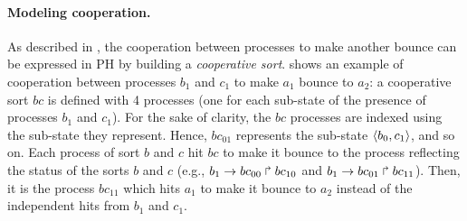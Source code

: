 \begin{comment}
This PH example actually models a BRN where the component $a$ has three qualitative
levels and components $b$ and $c$ are boolean.
In this BRN, $b$ and $c$ activate $a$, while $a$ inhibits $b$.
The inhibition of $b$ by $a$ is only effective when $a$ is at level $2$;
in the other cases, $b$ cannot evolve in any direction.
The activation of $a$ by $b$ ($c$) is encoded by the actions making the level of $a$ increase (resp.
decrease) when $b$ ($c$) is present (resp. absent).
It is worth noticing that the activation of $a$ by $b$ ($c$) is independent from $c$ ($b$).
This may express a lack of knowledge on the cooperation between these two regulators:
we thus model an over-approximation of the possible actions.
\end{example*}
\end{comment}

\paragraph{Modeling cooperation.}
As described in \cite{PMR10-TCSB}, the cooperation between processes to make another bounce can be
expressed in PH by building a \emph{cooperative sort}.
 shows an example of cooperation between processes $b_1$ and $c_1$ to
make $a_1$ bounce to $a_2$:
a cooperative sort $bc$ is defined with 4 processes (one for each sub-state of the presence of
processes $b_1$ and $c_1$).
For the sake of clarity, the $bc$ processes are indexed using the sub-state they represent.
Hence, $bc_{01}$ represents the sub-state $\mbox{$\langle b_0,c_1 \rangle$}$, and so on.
Each process of sort $b$ and $c$ hit $bc$ to make it bounce to the process reflecting the status of the sorts $b$
and $c$ (e.g., $b_1\rightarrow bc_{00}\Rsh bc_{10}$ and $b_1\rightarrow bc_{01}\Rsh bc_{11}$).
Then, it is the process $bc_{11}$ which hits $a_1$ to make it bounce to $a_2$ instead of the
independent hits from $b_1$ and $c_1$.

